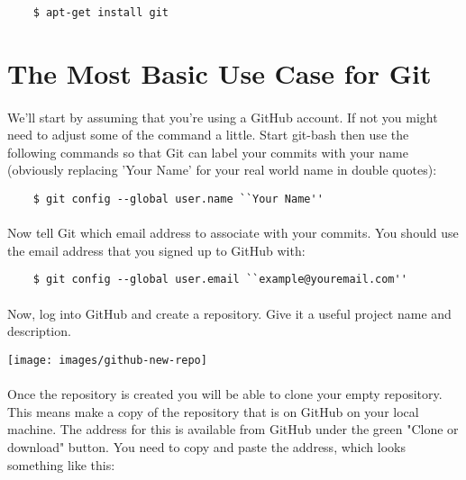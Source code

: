 \documentclass[10pt, a4paper]{article}
\begin{document}
\begin{lstlisting}
    $ apt-get install git
\end{lstlisting}


\section{The Most Basic Use Case for Git}

\paragraph{} We'll start by assuming that you're using a GitHub account. If not you might need to adjust some of the command a little. Start git-bash then use the following commands so that Git can label your commits with your name (obviously replacing 'Your Name' for your real world name in double quotes):

\begin{lstlisting}
    $ git config --global user.name ``Your Name''
\end{lstlisting}

\paragraph{} Now tell Git which email address to associate with your commits. You should use the email address that you signed up to GitHub with:

\begin{lstlisting}
    $ git config --global user.email ``example@youremail.com''
\end{lstlisting}

\paragraph{} Now, log into GitHub and create a repository. Give it a useful project name and description. 

\texttt{[image: images/github-new-repo]}

\paragraph{} Once the repository is created you will be able to clone your empty repository. This means make a copy of the repository that is on GitHub on your local machine. The address for this is available from GitHub under the green "Clone or download" button. You need to copy and paste the address, which looks something like this:
\end{document}
